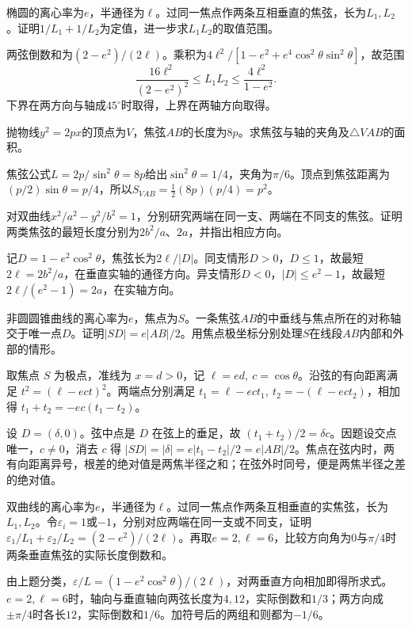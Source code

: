 椭圆的离心率为\(e\)，半通径为\(\ell\)。过同一焦点作两条互相垂直的焦弦，长为\(L_1,L_2\)。证明\(1/L_1+1/L_2\)为定值，进一步求\(L_1L_2\)的取值范围。
\par
\solutionanswer
两弦倒数和为\((2-e^2)/(2\ell)\)。乘积为\(4\ell^2/[1-e^2+e^4\cos^2\theta\sin^2\theta]\)，故范围
\[
\frac{16\ell^2}{(2-e^2)^2}\le L_1L_2\le\frac{4\ell^2}{1-e^2}.
\]
下界在两方向与轴成\(45^\circ\)时取得，上界在两轴方向取得。


抛物线\(y^2=2px\)的顶点为\(V\)，焦弦\(AB\)的长度为\(8p\)。求焦弦与轴的夹角及\(\triangle VAB\)的面积。
\par
\solutionanswer
焦弦公式\(L=2p/\sin^2\theta=8p\)给出\(\sin^2\theta=1/4\)，夹角为\(\pi/6\)。顶点到焦弦距离为\((p/2)\sin\theta=p/4\)，所以\(S_{VAB}=\frac12(8p)(p/4)=p^2\)。


对双曲线\(x^2/a^2-y^2/b^2=1\)，分别研究两端在同一支、两端在不同支的焦弦。证明两类焦弦的最短长度分别为\(2b^2/a\)、\(2a\)，并指出相应方向。
\par
\solutionanswer
记\(D=1-e^2\cos^2\theta\)，焦弦长为\(2\ell/|D|\)。同支情形\(D>0\)，\(D\le1\)，故最短\(2\ell=2b^2/a\)，在垂直实轴的通径方向。异支情形\(D<0\)，\(|D|\le e^2-1\)，故最短\(2\ell/(e^2-1)=2a\)，在实轴方向。


非圆圆锥曲线的离心率为\(e\)，焦点为\(S\)。一条焦弦\(AB\)的中垂线与焦点所在的对称轴交于唯一点\(D\)。证明\(|SD|=e|AB|/2\)。用焦点极坐标分别处理\(S\)在线段\(AB\)内部和外部的情形。
\par
\solutionanswer
取焦点 \(S\) 为极点，准线为 \(x=d>0\)，记 \(\ell=ed,\ c=\cos\theta\)。沿弦的有向距离满足 \(t^2=(\ell-ect)^2\)。两端点分别满足 \(t_1=\ell-ect_1,\ t_2=-(\ell-ect_2)\)，相加得 \(t_1+t_2=-ec(t_1-t_2)\)。

设 \(D=(\delta,0)\)。弦中点是 \(D\) 在弦上的垂足，故 \((t_1+t_2)/2=\delta c\)。因题设交点唯一，\(c\ne0\)，消去 \(c\) 得 \(|SD|=|\delta|=e|t_1-t_2|/2=e|AB|/2\)。焦点在弦内时，两有向距离异号，根差的绝对值是两焦半径之和；在弦外时同号，便是两焦半径之差的绝对值。


双曲线的离心率为\(e\)，半通径为\(\ell\)。过同一焦点作两条互相垂直的实焦弦，长为\(L_1,L_2\)。令\(\varepsilon_i=1\)或\(-1\)，分别对应两端在同一支或不同支，证明\(\varepsilon_1/L_1+\varepsilon_2/L_2=(2-e^2)/(2\ell)\)。再取\(e=2,\ell=6\)，比较方向角为\(0\)与\(\pi/4\)时两条垂直焦弦的实际长度倒数和。
\par
\solutionanswer
由上题分类，\(\varepsilon/L=(1-e^2\cos^2\theta)/(2\ell)\)，对两垂直方向相加即得所求式。\(e=2,\ell=6\)时，轴向与垂直轴向两弦长度为\(4,12\)，实际倒数和\(1/3\)；两方向成\(\pm\pi/4\)时各长\(12\)，实际倒数和\(1/6\)。加符号后的两组和则都为\(-1/6\)。


